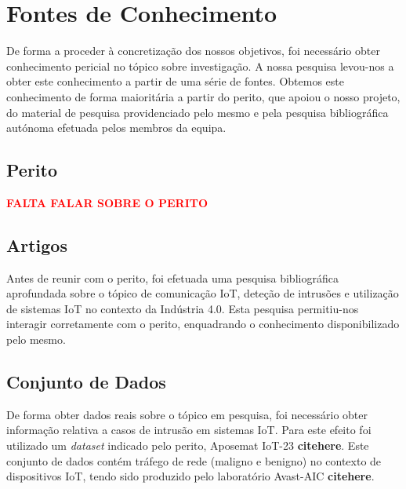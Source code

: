\section{Fontes de Conhecimento}

De forma a proceder à concretização dos nossos objetivos, foi necessário obter conhecimento pericial no tópico sobre investigação. A nossa pesquisa levou-nos a obter este conhecimento a partir de uma série de fontes. Obtemos este conhecimento de forma maioritária a partir do perito, que apoiou o nosso projeto, do material de pesquisa providenciado pelo mesmo e pela pesquisa bibliográfica autónoma efetuada pelos membros da equipa.

\subsection{Perito}

\textcolor{red}{\textbf{FALTA FALAR SOBRE O PERITO}}

\subsection{Artigos}

Antes de reunir com o perito, foi efetuada uma pesquisa bibliográfica aprofundada sobre o tópico de comunicação IoT, deteção de intrusões e utilização de sistemas IoT no contexto da Indústria 4.0. Esta pesquisa permitiu-nos interagir corretamente com o perito, enquadrando o conhecimento disponibilizado pelo mesmo.

\subsection{Conjunto de Dados}

De forma obter dados reais sobre o tópico em pesquisa, foi necessário obter informação relativa a casos de intrusão em sistemas IoT. Para este efeito foi utilizado um \textit{dataset} indicado pelo perito, Aposemat IoT-23 \textbf{citehere}. Este conjunto de dados contém tráfego de rede (maligno e benigno) no contexto de dispositivos IoT, tendo sido produzido pelo laboratório Avast-AIC \textbf{citehere}.